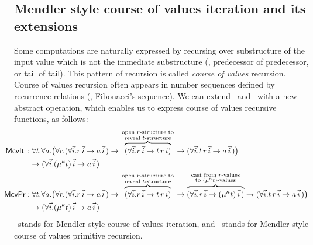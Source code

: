 \subsection{Mendler style course of values iteration and its extensions}
\label{sec:mendler:cv}
Some computations are naturally expressed by recursing over substructure
of the input value which is not the immediate substructure (\eg, predecessor of predecessor,
or tail of tail). This pattern of recursion is called \emph{course of values}
recursion. Course of values recursion often appears in number sequences
defined by recurrence relations (\eg, Fibonacci's sequence).
We can extend \MIt\ and \MPr\ with a new abstract operation, which enables
us to express course of values recursive functions, as follows:
\begin{align*}
\!\!\!\!\!\!\!\!
 \McvIt\, :&\; \forall t . \forall a .
   \big( \forall r .
         (\forall\vec{i} . r\,\vec{i} -> a\,\vec{i}\,)
   -> \overbraceset{\begin{smallmatrix}
                     \text{open $r$-structure to} \\
                     \text{reveal $t$-structure} \\
                    \end{smallmatrix}}{
         (\forall\vec{i} . r\,\vec{i} -> t\,r\, i) }
   ->    (\forall\vec{i} . t\, r\,\vec{i} -> a\,\vec{i}\,)
   \big) \\
& -> (\forall\vec{i} . (\mu^\kappa t)\,\vec{i} -> a\,\vec{i}\,) \\
\!\!\!\!\!\!\!\!
 \McvPr :&\; \forall t . \forall a .
   \big( \forall r .   
         (\forall\vec{i} . r\,\vec{i} -> a\,\vec{i}\,)
   -> \overbraceset{\begin{smallmatrix}
                     \text{open $r$-structure to} \\
                     \text{reveal $t$-structure} \\
                    \end{smallmatrix}}{
         (\forall\vec{i} . r\,\vec{i} -> t\,r\,i) }
   -> \overbraceset{\begin{smallmatrix}
                     \text{cast from $r$-values} \\
                     \text{to $(\mu^\kappa t)$-values} \\
                    \end{smallmatrix}}{
         (\forall\vec{i} . r\,\vec{i} -> (\mu^\kappa t)\,\vec{i}\,) }
   ->    (\forall\vec{i} . t\, r\,\vec{i} -> a\,\vec{i}\,)
   \big)\\ 
& -> (\forall\vec{i} . (\mu^\kappa t)\,\vec{i} -> a\,\vec{i}\,)
\end{align*}
\McvIt\ stands for Mendler style course of values iteration,
and \McvPr\ stands for Mendler style course of values primitive recursion.

